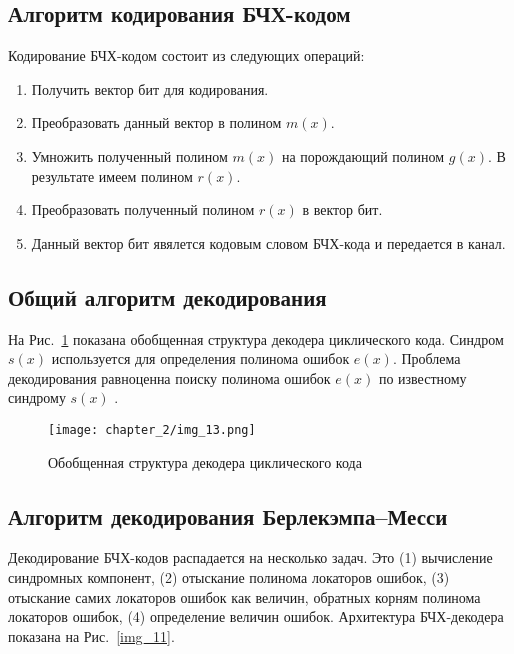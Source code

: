 \subsection{Алгоритм кодирования БЧХ-кодом}
Кодирование БЧХ-кодом состоит из следующих операций:
\begin{enumerate}
  \item Получить вектор бит для кодирования.
  \item Преобразовать данный вектор в полином $m(x)$.
  \item Умножить полученный полином $m(x)$ на порождающий полином $g(x)$. В результате имеем полином $r(x)$.
  \item Преобразовать полученный полином $r(x)$ в вектор бит.
  \item Данный вектор бит явялется кодовым словом БЧХ-кода и передается в канал.
\end{enumerate}

\subsection{Общий алгоритм декодирования}
На Рис.~\ref{img_13} показана обобщенная структура декодера циклического кода. Синдром
$s(x)$ используется для определения полинома ошибок $e(x)$. Проблема декодирования равноценна
поиску полинома ошибок $e(x)$ по известному синдрому $s(x)$ .

\begin{figure}[htbp]
\begin{center}
\texttt{[image: chapter\_2/img\_13.png]}
\end{center}
\caption{Обобщенная структура декодера циклического кода}
\label{img_13}
\end{figure}

\subsection{Алгоритм декодирования Берлекэмпа–Месси}
Декодирование БЧХ-кодов распадается на несколько задач. Это (1) вычисление синдромных компонент, (2) 
отыскание полинома локаторов ошибок, (3) отыскание самих локаторов ошибок как величин, обратных корням 
полинома локаторов ошибок, (4) определение величин ошибок. Архитектура БЧХ-декодера показана
на Рис.~\ref{img_11}.

